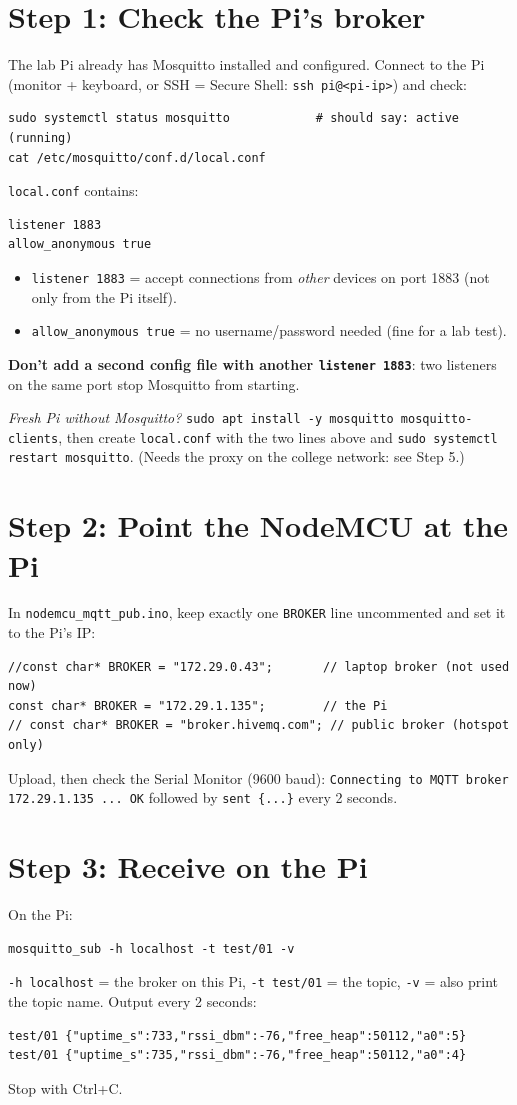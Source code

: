 \documentclass[11pt]{article}
\begin{document}
\section*{Step 1: Check the Pi's broker}
The lab Pi already has Mosquitto installed and configured. Connect to the Pi (monitor + keyboard, or SSH = Secure Shell: \texttt{ssh pi@<pi-ip>}) and check:
\begin{verbatim}
sudo systemctl status mosquitto            # should say: active (running)
cat /etc/mosquitto/conf.d/local.conf
\end{verbatim}
\texttt{local.conf} contains:
\begin{verbatim}
listener 1883
allow_anonymous true
\end{verbatim}
\begin{itemize}
\item \texttt{listener 1883} = accept connections from \emph{other} devices on port 1883 (not only from the Pi itself).
\item \texttt{allow\_anonymous true} = no username/password needed (fine for a lab test).
\end{itemize}
\textbf{Don't add a second config file with another \texttt{listener 1883}}: two listeners on the same port stop Mosquitto from starting.

\textit{Fresh Pi without Mosquitto?} \texttt{sudo apt install -y mosquitto mosquitto-clients}, then create \texttt{local.conf} with the two lines above and
\texttt{sudo systemctl restart mosquitto}. (Needs the proxy on the college network: see Step 5.)

\newpage
\section*{Step 2: Point the NodeMCU at the Pi}
In \texttt{nodemcu\_mqtt\_pub.ino}, keep exactly one \texttt{BROKER} line uncommented and set it to the Pi's IP:
\begin{verbatim}
//const char* BROKER = "172.29.0.43";       // laptop broker (not used now)
const char* BROKER = "172.29.1.135";        // the Pi
// const char* BROKER = "broker.hivemq.com"; // public broker (hotspot only)
\end{verbatim}
Upload, then check the Serial Monitor (9600 baud): \texttt{Connecting to MQTT broker 172.29.1.135 ... OK} followed by \texttt{sent \{...\}} every 2 seconds.

\section*{Step 3: Receive on the Pi}
On the Pi:
\begin{verbatim}
mosquitto_sub -h localhost -t test/01 -v
\end{verbatim}
\texttt{-h localhost} = the broker on this Pi, \texttt{-t test/01} = the topic, \texttt{-v} = also print the topic name. Output every 2 seconds:
\begin{verbatim}
test/01 {"uptime_s":733,"rssi_dbm":-76,"free_heap":50112,"a0":5}
test/01 {"uptime_s":735,"rssi_dbm":-76,"free_heap":50112,"a0":4}
\end{verbatim}
Stop with Ctrl+C.
\end{document}
